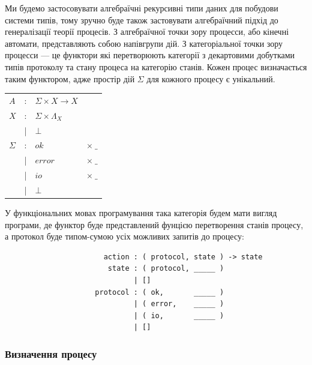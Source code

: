 \documentclass[11pt,oneside]{article}
\begin{document}
   Ми будемо застосовувати алгебраїчні рекурсивні типи даних для побудови системи типів, тому
   зручно буде також застовувати алгебраїчний підхід до генералізації теорії процесів.
   З алгебраїчної точки зору процесси, або кінечні автомати, представляють собою напівгрупи дій.
   З категоріальної точки зору процесси --- це функтори які перетворюють категорії з декартовими добутками
   типів протоколу та стану процеса на категорію станів. Кожен процес визначається таким функтором, адже
   простір дій $\Sigma$ для кожного процесу є унікальний.

\begin{center}
\begin{tabular}{lcll}
$A$         &:& $\Sigma \times X \rightarrow X  $ &\\
$X$         &:& $\Sigma \times \Lambda_{X} $ &\\
            &|& $\bot                              $ &\\
$\Sigma$    &:& $ok$    & $\times\ \_$          \\
            &|& $error$ & $\times\ \_$          \\
            &|& $io$    & $\times\ \_$          \\
            &|& $\bot                              $ &\\
\end{tabular}
\end{center}

   У функціональних мовах програмування така категорія будем мати вигляд програми,
   де функтор буде представлений фунцією перетворення станів процесу, а протокол
   буде типом-сумою усіх можливих запитів до процесу:

\begin{center}
\begin{lstlisting}
                       action : ( protocol, state ) -> state
                        state : ( protocol, _____ )
                              | []
                     protocol : ( ok,       _____ )
                              | ( error,    _____ )
                              | ( io,       _____ )
                              | []
\end{lstlisting}
\end{center}

   \subsubsection*{Визначення процесу}
\end{document}
